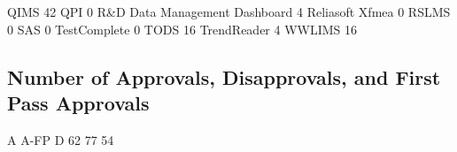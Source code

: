 \documentclass{article}
\begin{document}
\begin{Schunk}
\begin{Soutput}
                                                     QIMS 
                                                       42 
                                                      QPI 
                                                        0 
                            R&D Data Management Dashboard 
                                                        4 
                                          Reliasoft Xfmea 
                                                        0 
                                                    RSLMS 
                                                        0 
                                                      SAS 
                                                        0 
                                             TestComplete 
                                                        0 
                                                     TODS 
                                                       16 
                                              TrendReader 
                                                        4 
                                                   WWLIMS 
                                                       16 
\end{Soutput}
\end{Schunk}

\subsection{Number of Approvals, Disapprovals, and First Pass Approvals}

\begin{Schunk}
\begin{Soutput}
   A A-FP    D 
  62   77   54 
\end{Soutput}
\end{Schunk}
\end{document}
